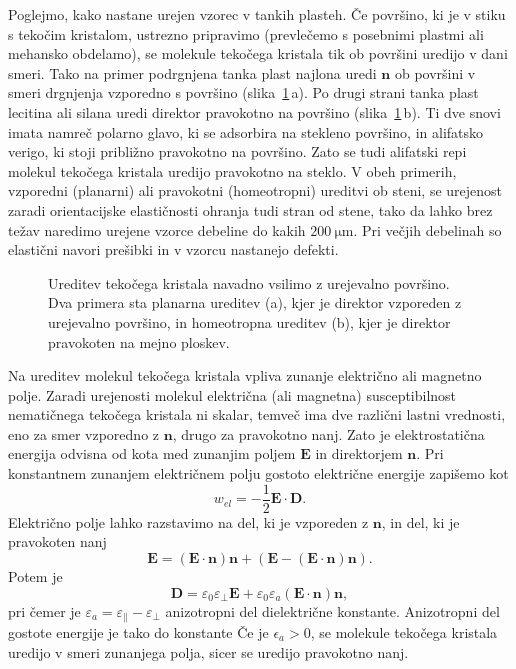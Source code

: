 Poglejmo, kako nastane urejen vzorec v tankih plasteh. Če površino,
ki je v stiku s tekočim kristalom, ustrezno pripravimo (prevlečemo s posebnimi 
plastmi ali mehansko obdelamo), se molekule tekočega kristala tik ob površini uredijo
v dani smeri. Tako na primer podrgnjena tanka plast najlona uredi
$\mathbf{n}$ ob površini v smeri drgnjenja vzporedno s površino (slika~\ref{s7.20a}\,a). 
Po drugi strani tanka plast lecitina ali silana uredi direktor 
pravokotno na površino (slika~\ref{s7.20a}\,b). Ti dve snovi imata namreč
polarno glavo, ki se adsorbira na stekleno površino, in alifatsko verigo, 
ki stoji približno pravokotno na površino. Zato se tudi alifatski repi molekul
tekočega kristala uredijo pravokotno na steklo. V obeh primerih, 
vzporedni (planarni) ali pravokotni (homeotropni) ureditvi ob steni, 
se urejenost zaradi orientacijske elastičnosti
ohranja tudi stran od stene, tako da lahko brez težav naredimo urejene
vzorce debeline do kakih $200~\si{\micro\metre}$. Pri večjih debelinah so elastični
navori prešibki in v vzorcu nastanejo defekti.
\begin{figure}[ht]
\centering 
\def\svgwidth{120truemm} 

\caption{Ureditev tekočega kristala navadno vsilimo z urejevalno površino. Dva primera
sta planarna ureditev (a), kjer je direktor vzporeden z urejevalno površino, in 
homeotropna ureditev (b), kjer je direktor pravokoten na mejno ploskev.}
\label{s7.20a}
\end{figure}
 
Na ureditev molekul tekočega kristala vpliva zunanje električno ali magnetno polje.
Zaradi urejenosti molekul električna (ali magnetna) susceptibilnost nematičnega tekočega
kristala ni skalar, temveč ima dve različni lastni vrednosti,
eno za smer vzporedno z $\mathbf{n}$, drugo za pravokotno nanj. Zato je
elektrostatična energija odvisna od kota med zunanjim poljem $\mathbf{E}$
in direktorjem $\mathbf{n}$. Pri konstantnem zunanjem električnem polju 
gostoto električne energije zapišemo kot 
\begin{equation}
w_{el}=-\frac{1}{2}\mathbf{E}\cdot \mathbf{D}.
\label{lcwe}
\end{equation}
Električno polje lahko razstavimo na del, ki je vzporeden z $\mathbf{n}$, in del, ki je
pravokoten nanj
\begin{equation}
\mathbf{E} = (\mathbf{E} \cdot \mathbf{n}) \mathbf{n} + \left( \mathbf{E} - 
(\mathbf{E} \cdot \mathbf{n}) \mathbf{n} \right).
\end{equation}
Potem je 
\begin{equation}
\mathbf{D} = \varepsilon_0 \varepsilon_\bot \mathbf{E} + \varepsilon_0 \varepsilon_a
(\mathbf{E}\cdot\mathbf{n})\mathbf{n},
\label{7.56a}
\end{equation}
pri čemer je $\varepsilon_a = \varepsilon_\parallel - \varepsilon_\bot$ anizotropni
del dielektrične konstante. Anizotropni del gostote energije je tako do konstante
Če je $\epsilon_{a}>0$, se molekule tekočega kristala uredijo v smeri 
zunanjega polja, sicer se uredijo pravokotno nanj.

